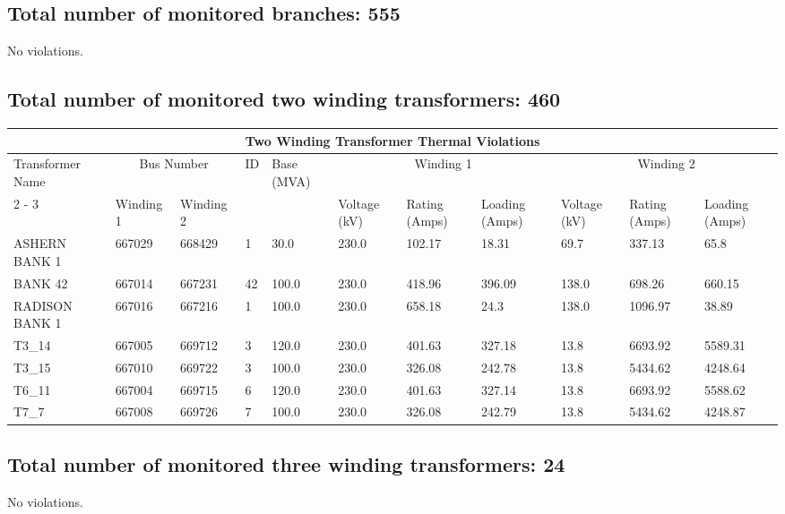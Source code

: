 \documentclass{article}%
\begin{document}
%
\subsection*{Total number of monitored branches: 555}%
\label{subsec:Totalnumberofmonitoredbranches555}%
No violations.

%
\subsection*{Total number of monitored two winding transformers: 460}%
\label{subsec:Totalnumberofmonitoredtwowindingtransformers460}%
\begin{tabularx}{\textwidth}{| p{1.7cm} | X | X |p{0.3cm} | X | X | X | X | X | X | X |}%
\hline%
\multicolumn{11}{|c|}{Two Winding Transformer Thermal Violations}\\%
\hline%
Transformer Name&\multicolumn{2}{|c|}{Bus Number}&ID&Base (MVA)&\multicolumn{3}{|c|}{Winding 1}&\multicolumn{3}{|c|}{Winding 2}\\%
\cline{2%
-%
3}%
\cline{6%
-%
11}%
&Winding 1&Winding 2&&&Voltage (kV)&Rating (Amps)&Loading (Amps)&Voltage (kV)&Rating (Amps)&Loading (Amps)\\%
\hline%
ASHERN BANK 1&667029&668429&1&30.0&230.0&102.17&18.31&69.7&337.13&65.8\\%
\hline%
\hline%
BANK 42&667014&667231&42&100.0&230.0&418.96&396.09&138.0&698.26&660.15\\%
\hline%
\hline%
RADISON BANK 1&667016&667216&1&100.0&230.0&658.18&24.3&138.0&1096.97&38.89\\%
\hline%
\hline%
T3\_14&667005&669712&3&120.0&230.0&401.63&327.18&13.8&6693.92&5589.31\\%
\hline%
\hline%
T3\_15&667010&669722&3&100.0&230.0&326.08&242.78&13.8&5434.62&4248.64\\%
\hline%
\hline%
T6\_11&667004&669715&6&120.0&230.0&401.63&327.14&13.8&6693.92&5588.62\\%
\hline%
\hline%
T7\_7&667008&669726&7&100.0&230.0&326.08&242.79&13.8&5434.62&4248.87\\%
\hline%
\end{tabularx}

%
\subsection*{Total number of monitored three winding transformers: 24}%
\label{subsec:Totalnumberofmonitoredthreewindingtransformers24}%
No violations.

%
\end{document}
